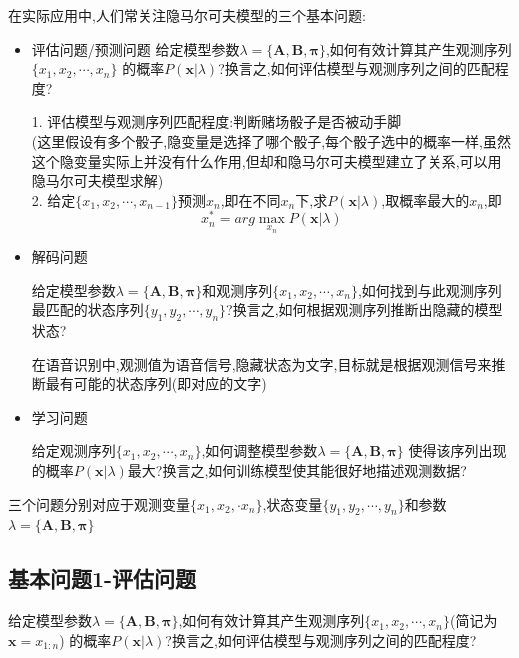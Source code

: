 \documentclass[UTF8,a4paper]{ctexart}%
\begin{document}
            在实际应用中,人们常关注隐马尔可夫模型的三个基本问题:
            \begin{itemize}
              \item 评估问题/预测问题
                  给定模型参数$\lambda = \{\bm{A,B,\pi}\}$,如何有效计算其产生观测序列$\{x_1, x_2, \cdots , x_n\}$ 的概率$P(\bm{x} | \lambda)$?换言之,如何评估模型与观测序列之间的匹配程度?

                  {\color{blue}
                      1. 评估模型与观测序列匹配程度:判断赌场骰子是否被动手脚\\(这里假设有多个骰子,隐变量是选择了哪个骰子,每个骰子选中的概率一样,虽然这个隐变量实际上并没有什么作用,但却和隐马尔可夫模型建立了关系,可以用隐马尔可夫模型求解)\\
                      2. 给定$\{x_1, x_2, \cdots , x_{n-1}\}$预测$x_n$,即在不同$x_n$下,求$P(\bm{x} | \lambda)$,取概率最大的$x_n$,即
                          \[ x_n^* = arg \max_{x_n} P(\bm{x} | \lambda) \]
                  }

              \item 解码问题

                  给定模型参数$\lambda = \{\bm{A,B,\pi}\}$和观测序列$\{x_1, x_2, \cdots , x_n\}$,如何找到与此观测序列最匹配的状态序列$\{y_1,y_2 , \cdots , y_n\}$?换言之,如何根据观测序列推断出隐藏的模型状态?

                  {\color{blue}
                      在语音识别中,观测值为语音信号,隐藏状态为文字,目标就是根据观测信号来推断最有可能的状态序列(即对应的文字)
                  }

              \item 学习问题

                  给定观测序列$\{x_1, x_2, \cdots , x_n\}$,如何调整模型参数$\lambda = \{\bm{A,B,\pi}\}$ 使得该序列出现的概率$P(\bm{x} | \lambda)$最大?换言之,如何训练模型使其能很好地描述观测数据?

            \end{itemize}


            {\color{blue}
                三个问题分别对应于观测变量$\{x_1,x_2,\cdot x_n\}$,状态变量$\{y_1,y_2 , \cdots , y_n\}$和参数$\lambda = \{\bm{A,B,\pi}\}$
            }

        \subsection{基本问题1-评估问题}
            给定模型参数$\lambda = \{\bm{A,B,\pi}\}$,如何有效计算其产生观测序列$\{x_1, x_2, \cdots , x_n\}$(简记为$\bm{x} = x_{1:n}$) 的概率$P(\bm{x} | \lambda)$?换言之,如何评估模型与观测序列之间的匹配程度?
\end{document}
